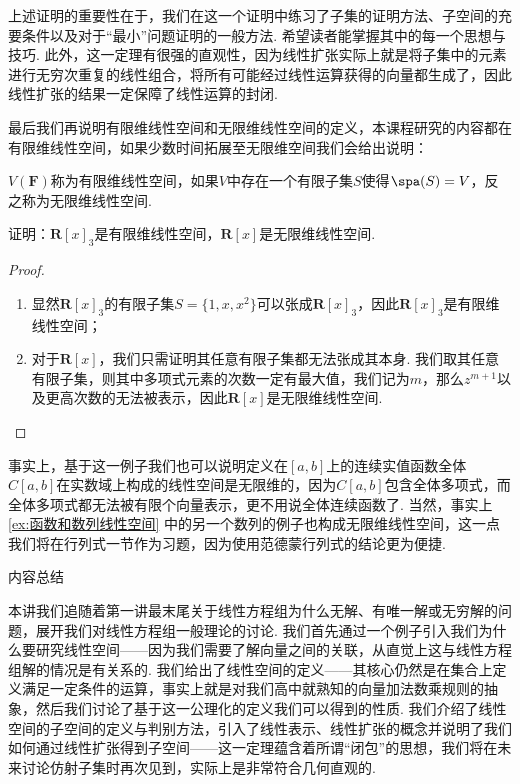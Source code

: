 上述证明的重要性在于，我们在这一个证明中练习了子集的证明方法、子空间的充要条件以及对于``最小''问题证明的一般方法. 希望读者能掌握其中的每一个思想与技巧. 此外，这一定理有很强的直观性，因为线性扩张实际上就是将子集中的元素进行无穷次重复的线性组合，将所有可能经过线性运算获得的向量都生成了，因此线性扩张的结果一定保障了线性运算的封闭.

最后我们再说明有限维线性空间和无限维线性空间的定义，本课程研究的内容都在有限维线性空间，如果少数时间拓展至无限维空间我们会给出说明：
\begin{definition}{}{}
    $V(\mathbf{F})$称为有限维线性空间，如果$V$中存在一个有限子集$S$使得$\spa(S)=V$，反之称为无限维线性空间.
\end{definition}

\begin{example}{}{}
    证明：$\mathbf{R}[x]_3$是有限维线性空间，$\mathbf{R}[x]$是无限维线性空间.
\end{example}

\begin{proof}
    \begin{enumerate}
        \item 显然$\mathbf{R}[x]_3$的有限子集$S=\{1,x,x^2\}$可以张成$\mathbf{R}[x]_3$，因此$\mathbf{R}[x]_3$是有限维线性空间；

        \item 对于$\mathbf{R}[x]$，我们只需证明其任意有限子集都无法张成其本身. 我们取其任意有限子集，则其中多项式元素的次数一定有最大值，我们记为$m$，那么$z^{m+1}$以及更高次数的无法被表示，因此$\mathbf{R}[x]$是无限维线性空间.
    \end{enumerate}
\end{proof}

事实上，基于这一例子我们也可以说明定义在$[a,b]$上的连续实值函数全体$C[a,b]$在实数域上构成的线性空间是无限维的，因为$C[a,b]$包含全体多项式，而全体多项式都无法被有限个向量表示，更不用说全体连续函数了. 当然，事实上\autoref{ex:函数和数列线性空间} 中的另一个数列的例子也构成无限维线性空间，这一点我们将在行列式一节作为习题，因为使用范德蒙行列式的结论更为便捷.

\vspace{2ex}
\centerline{\heiti \Large 内容总结}

本讲我们追随着第一讲最末尾关于线性方程组为什么无解、有唯一解或无穷解的问题，展开我们对线性方程组一般理论的讨论. 我们首先通过一个例子引入我们为什么要研究线性空间——因为我们需要了解向量之间的关联，从直觉上这与线性方程组解的情况是有关系的. 我们给出了线性空间的定义——其核心仍然是在集合上定义满足一定条件的运算，事实上就是对我们高中就熟知的向量加法数乘规则的抽象，然后我们讨论了基于这一公理化的定义我们可以得到的性质. 我们介绍了线性空间的子空间的定义与判别方法，引入了线性表示、线性扩张的概念并说明了我们如何通过线性扩张得到子空间——这一定理蕴含着所谓``闭包''的思想，我们将在未来讨论仿射子集时再次见到，实际上是非常符合几何直观的.

